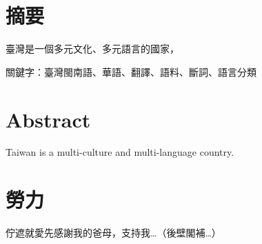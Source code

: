 \documentclass[final,oneside,onecolumn,12pt,a4paper]{book}%
\begin{document}
\newpage

\chapter{摘要}
臺灣是一個多元文化、多元語言的國家，

關鍵字：臺灣閩南語、華語、翻譯、語料、斷詞、語言分類
\newpage

\chapter{Abstract}
Taiwan is a multi-culture and multi-language country.

\newpage

\chapter{勞力}
佇遮就愛先感謝我的爸母，支持我…（後壁閣補…）

\newpage

\tableofcontents
\listoffigures
\listoftables

\mainmatter











\begin{appendices}



\end{appendices}
\end{document}

